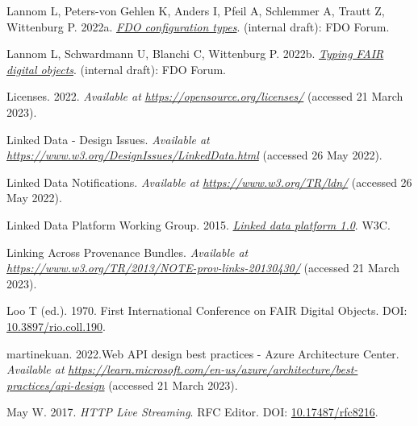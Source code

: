 \begin{CSLReferences}{1}{0}
\leavevmode{}%
Lannom L, Peters-von Gehlen K, Anders I, Pfeil A, Schlemmer A, Trautt Z, Wittenburg P. 2022a. \emph{\href{https://docs.google.com/document/d/1ivvg3C_QWSO9PIQwkKT89xG4fBhNAs7_6b0Dz11EwDg/edit}{FDO configuration types}}. (internal draft): FDO Forum.

\leavevmode{}%
Lannom L, Schwardmann U, Blanchi C, Wittenburg P. 2022b. \emph{\href{https://docs.google.com/document/d/1X0hcOVIqP7iYIJf9u-7x3RwcXK8ecsauy0FZg_6-Bg0/edit}{Typing FAIR digital objects}}. (internal draft): FDO Forum.

\leavevmode{}%
Licenses. 2022. \emph{Available at} \href{https://opensource.org/licenses/}{\emph{https://opensource.org/licenses/}} (accessed 21 March 2023).

\leavevmode{}%
Linked Data - Design Issues. \emph{Available at} \href{https://www.w3.org/DesignIssues/LinkedData.html}{\emph{https://www.w3.org/DesignIssues/LinkedData.html}} (accessed 26 May 2022).

\leavevmode{}%
Linked Data Notifications. \emph{Available at} \href{https://www.w3.org/TR/ldn/}{\emph{https://www.w3.org/TR/ldn/}} (accessed 26 May 2022).

\leavevmode{}%
Linked Data Platform Working Group. 2015. \emph{\href{https://www.w3.org/TR/2015/REC-ldp-20150226/}{Linked data platform 1.0}}. W3C.

\leavevmode{}%
Linking Across Provenance Bundles. \emph{Available at} \href{https://www.w3.org/TR/2013/NOTE-prov-links-20130430/}{\emph{https://www.w3.org/TR/2013/NOTE-prov-links-20130430/}} (accessed 21 March 2023).

\leavevmode{}%
Loo T (ed.). 1970. First International Conference on FAIR Digital Objects. DOI: \href{https://doi.org/10.3897/rio.coll.190}{10.3897/rio.coll.190}.

\leavevmode{}%
martinekuan. 2022.Web API design best practices - Azure Architecture Center. \emph{Available at} \href{https://learn.microsoft.com/en-us/azure/architecture/best-practices/api-design}{\emph{https://learn.microsoft.com/en-us/azure/architecture/best-practices/api-design}} (accessed 21 March 2023).

\leavevmode{}%
May W. 2017. \emph{HTTP Live Streaming}. RFC Editor. DOI: \href{https://doi.org/10.17487/rfc8216}{10.17487/rfc8216}.


\end{CSLReferences}
